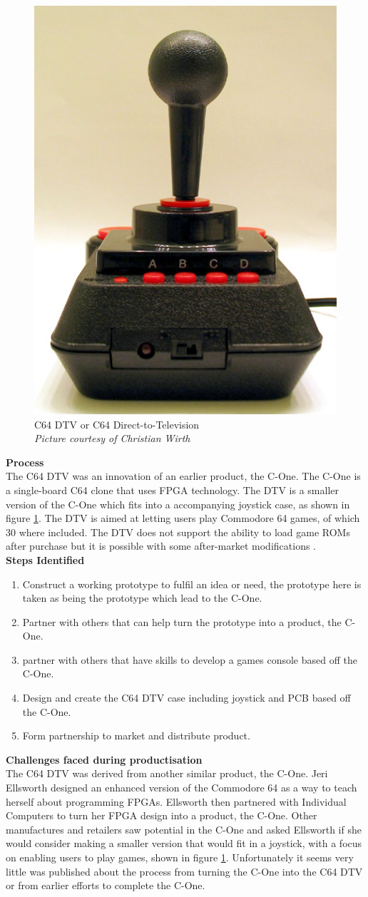 \begin{figure} \begin{center}
\includegraphics[width=.3\linewidth]{pics/C64_DTV} 
\end{center} 
\caption{C64 DTV or C64 Direct-to-Television \\ \textit{\small{Picture courtesy of Christian Wirth}}}
\label{C64_DTV}
\end{figure}

\textbf{Process}\\
The C64 DTV was an innovation of an earlier product, the C-One. The C-One is a single-board C64 clone that uses FPGA technology. The DTV is a smaller version of the C-One which fits into a accompanying joystick case, as shown in figure \ref{C64_DTV}. The DTV is aimed at letting users play Commodore 64 games, of which 30 where included. The DTV does not support the ability to load game ROMs after purchase but it is possible with some after-market modifications 
\cite{RN161}.\\

\textbf{Steps Identified}\\
\begin{enumerate}
\item Construct a working prototype to fulfil an idea or need, the prototype here is taken as being the prototype which lead to the C-One. 
\item Partner with others that can help turn the prototype into a product, the C-One.
\item partner with others that have skills to develop a games console based off the C-One.
\item Design and create the C64 DTV case including joystick and PCB based off the C-One.
\item Form partnership to market and distribute product.
\end{enumerate} 

\textbf{Challenges faced during productisation}\\
The C64 DTV was derived from another similar product, the C-One. Jeri Ellsworth designed an enhanced version of the Commodore 64 as a way to teach herself about programming FPGAs. Ellsworth then partnered with Individual Computers to turn her FPGA design into a product, the C-One. Other manufactures and retailers saw potential in the C-One and asked Ellsworth if she would consider making a smaller version that would fit in a joystick, with a focus on enabling users to play games, shown in figure \ref{C64_DTV}. Unfortunately it seems very little was published about the process from turning the C-One into the C64 DTV or from earlier efforts to complete the C-One.\\

